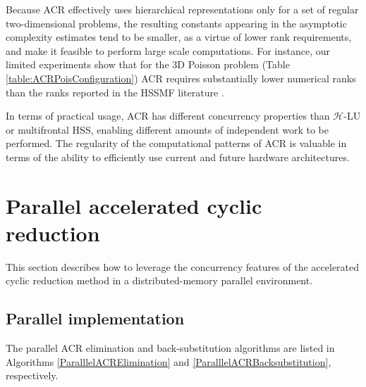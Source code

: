 \documentclass[]{elsarticle}
\begin{document}
Because ACR effectively uses hierarchical representations only for a set of regular two-dimensional problems, the resulting constants appearing in the asymptotic complexity estimates tend to be smaller, as a virtue of lower rank requirements, and make it feasible to perform large scale computations. For instance, our limited experiments show that for the 3D Poisson problem (Table \ref{table:ACRPoisConfiguration}) ACR requires substantially lower numerical ranks than the ranks reported in the HSSMF literature \cite{Wang2016,Ghysels15}.

In terms of practical usage, ACR has different concurrency properties than $\mathcal{H}$-LU or multifrontal HSS, enabling different amounts of independent work to be performed. The regularity of the computational patterns of ACR is valuable in terms of the ability to efficiently use current and future hardware architectures.

\section{Parallel accelerated cyclic reduction}
\label{parallelACR}
This section describes how to leverage the concurrency features of the accelerated cyclic reduction method in a distributed-memory parallel environment.

\subsection{Parallel implementation}
The parallel ACR elimination and back-substitution algorithms are listed in Algorithms \ref{ParalllelACRElimination} and \ref{ParalllelACRBacksubstitution}, respectively. 
\end{document}
